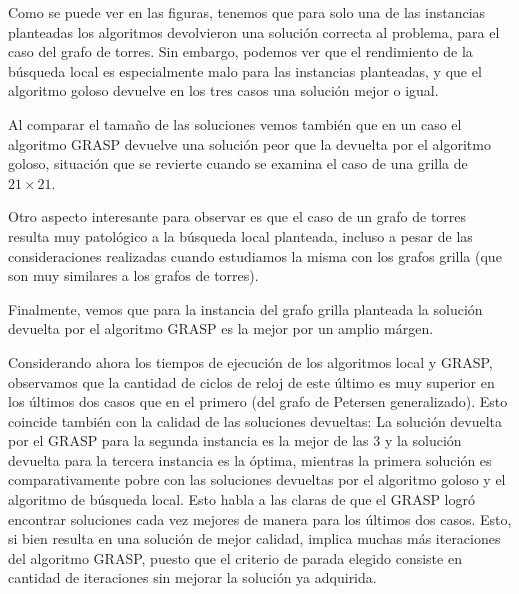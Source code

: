 Como se puede ver en las figuras, tenemos que para solo una de las 
instancias planteadas los algoritmos devolvieron una soluci\'on 
correcta al problema, para el caso del grafo de torres. Sin embargo,
podemos ver que el rendimiento de la b\'usqueda local es especialmente
malo para las instancias planteadas, y que el algoritmo goloso devuelve
en los tres casos una soluci\'on mejor o igual.

Al comparar el tama\~no de las soluciones vemos tambi\'en que en un caso
el algoritmo GRASP devuelve una soluci\'on peor que la devuelta por el
algoritmo goloso, situaci\'on que se revierte cuando se examina el caso
de una grilla de $21 \times 21$. 

Otro aspecto interesante para observar es que el caso de un grafo de 
torres resulta muy patol\'ogico a la b\'usqueda local planteada, incluso
a pesar de las consideraciones realizadas cuando estudiamos la misma con
los grafos grilla (que son muy similares a los grafos de torres).

Finalmente, vemos que para la instancia del grafo grilla planteada la
soluci\'on devuelta por el algoritmo GRASP es la mejor por un amplio 
m\'argen.

Considerando ahora los tiempos de ejecuci\'on de los algoritmos local y
GRASP, observamos que la cantidad de ciclos de reloj de este \'ultimo
es muy superior en los \'ultimos dos casos que en el primero (del grafo
de Petersen generalizado). Esto coincide tambi\'en con la calidad de las
soluciones devueltas: La soluci\'on devuelta por el GRASP para la segunda
instancia es la mejor de las 3 y la soluci\'on devuelta para la tercera
instancia es la \'optima, mientras la primera soluci\'on es 
comparativamente pobre con las soluciones devueltas por el algoritmo 
goloso y el algoritmo de b\'usqueda local. Esto habla a las claras de
que el GRASP logr\'o encontrar soluciones cada vez mejores de manera 
para los \'ultimos dos casos. Esto, si bien resulta en una soluci\'on
de mejor calidad, implica muchas m\'as iteraciones del algoritmo GRASP,
puesto que el criterio de parada elegido consiste en cantidad de 
iteraciones sin mejorar la soluci\'on ya adquirida. 
